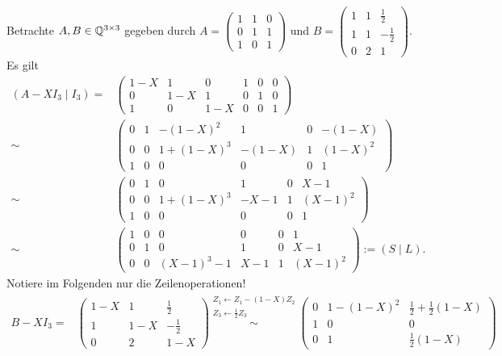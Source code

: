 \documentclass[../../main.tex]{subfiles}
\begin{document}
\begin{bsp}\label{17.4.13}
Betrachte $A,B\in\mathbb Q^{3\times 3}$ gegeben durch $A=\begin{pmatrix*}1&1&0\\0&1&1\\1&0&1\end{pmatrix*}$ und $B=\begin{pmatrix}1&1&\frac{1}{2}\\1&1&-\frac{1}{2}\\0&2&1\end{pmatrix}$. Es gilt
\begin{align*}
(A-XI_3\mid I_3)=&\left(\begin{array}{ccc|ccc}1-X&1&0&1&0&0\\
0&1-X&1&0&1&0\\1&0&1-X&0&0&1\end{array}\right)\\
\sim&\left(\begin{array}{ccc|ccc}0&1&-(1-X)^2&1&0&-(1-X)\\0&0&1+(1-X)^3&-(1-X)&1&(1-X)^2\\1&0&0&0&0&1\end{array}\right)\\
\sim&\left(\begin{array}{ccc|ccc}0&1&0&1&0&X-1\\0&0&1+(1-X)^3&-X-1&1&(X-1)^2\\1&0&0&0&0&1\end{array}\right)\\
\sim&\left(\begin{array}{ccc|ccc}1&0&0&0&0&1\\0&1&0&1&0&X-1\\0&0&(X-1)^3-1&X-1&1&(X-1)^2\end{array}\right):=(S\mid L).
\end{align*}
Notiere im Folgenden nur die Zeilenoperationen!
\begin{align*}
B-XI_3=&\begin{pmatrix}1-X&1&\frac{1}{2}\\1&1-X&-\frac{1}{2}\\0&2&1-X\end{pmatrix}\stackrel{\begin{smallmatrix}Z_1\leftarrow Z_1-(1-X)Z_2\\ Z_3\leftarrow \frac{1}{2}Z_3\end{smallmatrix}}{\sim}\begin{pmatrix}0&1-(1-X)^2&\frac{1}{2}+\frac{1}{2}(1-X)\\1&0&0\\0&1&\frac{1}{2}(1-X)\end{pmatrix}\\

\end{align*}
\end{bsp}
\end{document}
